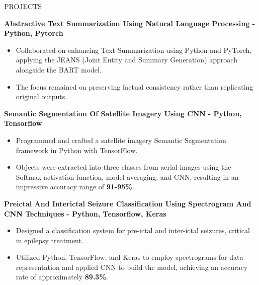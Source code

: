 \documentclass{resume} %
\begin{document}
\begin{rSection}{PROJECTS}
\vspace{-1.25em}
\item \textbf{Abstractive Text Summarization Using Natural Language Processing - } \textbf{Python, Pytorch} 
\begin{itemize}
    \itemsep -6pt {} 
     \item Collaborated on enhancing Text Summarization using Python and PyTorch, applying the JEANS (Joint Entity and Summary Generation) approach alongside the BART model.
     \item The focus remained on preserving factual consistency rather than replicating original outputs.
 \end{itemize}
 
\item \textbf{Semantic Segmentation Of Satellite Imagery Using CNN} \textbf{- Python, Tensorflow} 
\begin{itemize}
    \itemsep -6pt {} 
     \item Programmed and crafted a satellite imagery Semantic Segmentation framework in Python with TensorFlow.
     \item Objects were extracted into three classes from aerial images using the Softmax activation function, model averaging, and CNN, resulting in an impressive accuracy range of {\bf91-95\%}.
 \end{itemize}

\item \textbf{Preictal And Interictal Seizure Classification Using Spectrogram And CNN Techniques} \textbf{- Python, Tensorflow, Keras}  
\begin{itemize}
    \itemsep -6pt {} 
     \item Designed a classification system for pre-ictal and inter-ictal seizures, critical in epilepsy treatment.
     \item  Utilized Python, TensorFlow, and Keras to employ spectrograms for data representation and applied CNN to build the model, achieving an accuracy rate of approximately {\bf89.3\%}.
     
 \end{itemize}
 
\end{rSection} 
\end{document}
